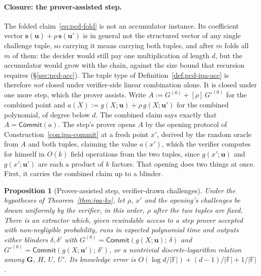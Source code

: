 \documentclass[11pt,a4paper]{article}
\newtheorem{proposition}[theorem]{Proposition}
\theoremstyle{definition}
\newcommand{\F}{\mathbb{F}}
\newcommand{\Comm}{\mathsf{Commit}}
\begin{document}
\paragraph{Closure: the prover-assisted step.}
The folded claim~\eqref{eq:pcd-fold} is not an accumulator instance.
Its coefficient vector $\mathbf s(\mathbf u) + \rho\,\mathbf s(\mathbf u')$ is
in general not the structured vector of any single challenge tuple, so carrying
it means carrying both tuples, and after $m$ folds all $m$ of them: the decider
would still pay one multiplication of length $d$, but the accumulator would grow
with the chain, against the size bound that recursion requires
(\S\ref{sec:pcd-acc}). The tuple type of
Definition~\ref{def:pcd-ipa-acc} is therefore \emph{not} closed under
verifier-side linear combination alone. It is closed under one more
step, which the prover assists. Write $A := G^{(0)} + [\rho]\,G'^{(0)}$
for the combined point and $a(X) := g(X; \mathbf u) + \rho\,g(X;
\mathbf u')$ for the combined polynomial, of degree below $d$. The
combined claim says exactly that $A = \Comm(a)$. The step's prover
opens $A$ by the opening protocol of Construction~\ref{con:ipa-commit}
at a fresh point $x'$, derived by the random oracle from $A$ and both
tuples, claiming the value $a(x')$, which the verifier computes for
himself in $O(k)$ field operations from the two tuples, since
$g(x'; \mathbf u)$ and $g(x'; \mathbf u')$ are each a product of $k$
factors. That opening does two things at once. First, it carries the
combined claim up to a blinder.

\begin{proposition}[Prover-assisted step, verifier-drawn challenges]
\label{prop:pcd-assisted}
Under the hypotheses of Theorem~\ref{thm:ipa-ks}, let $\rho$, $x'$ and
the opening's challenges be drawn uniformly by the verifier, in this
order, $\rho$ after the two tuples are fixed. There is an extractor
which, given rewindable access to a step prover accepted with
non-negligible probability, runs in expected polynomial time and outputs
either blinders $\delta, \delta'$ with
$G^{(0)} = \Comm(g(X; \mathbf u);\, \delta)$ and
$G'^{(0)} = \Comm(g(X; \mathbf u');\, \delta')$, or a nontrivial
discrete-logarithm relation among $\mathbf G$, $H$, $U$, $U'$. Its
knowledge error is $O(\log d/|\F|) + (d - 1)/|\F| + 1/|\F|$.
\end{proposition}
\end{document}
